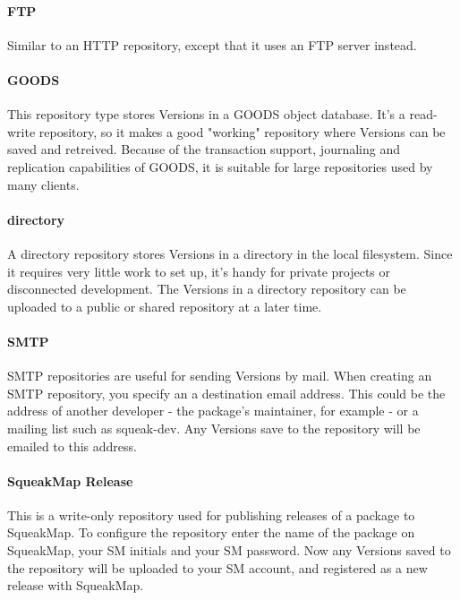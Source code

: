 \documentclass[a4paper,10pt,twoside]{book}
\begin{document}
\paragraph{FTP}

Similar to an HTTP repository, except that it uses an FTP server instead.

\paragraph{GOODS}

This repository type stores Versions in a GOODS object database. It's a read-write repository, so it makes a good "working" repository where Versions can be saved and retreived. Because of the transaction support, journaling and replication capabilities of GOODS, it is suitable for large repositories used by many clients.

\paragraph{directory}

A directory repository stores Versions in a directory in the local filesystem. Since it requires very little work to set up, it's handy for private projects or disconnected development. The Versions in a directory repository can be uploaded to a public or shared repository at a later time.

\paragraph{SMTP}

SMTP repositories are useful for sending Versions by mail. When creating an SMTP repository, you specify an a destination email address. This could be the address of another developer - the package's maintainer, for example - or a mailing list such as squeak-dev. Any Versions save to the repository will be emailed to this address.

\paragraph{SqueakMap Release}

This is a write-only repository used for publishing releases of a package to SqueakMap. To configure the repository enter the name of the package on SqueakMap, your SM initials and your SM password. Now any Versions saved to the repository will be uploaded to your SM account, and registered as a new release with SqueakMap.
\end{document}
